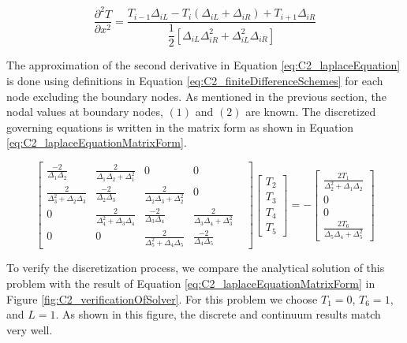 \begin{equation}\label{eq:C2_finiteDifferenceSchemes}
	\frac{\partial^2 T}{\partial x^2} = 
	\frac{T_{i-1} \Delta_{iL} - 
	      T_{i} (\Delta_{iL} + \Delta_{iR}) + 
	      T_{i+1} \Delta_{iR}}
	     {\dfrac{1}{2} \left[ \Delta_{iL} \Delta_{iR}^2 + 
	                         \Delta_{iL}^2 \Delta_{iR} \right]}
\end{equation}

The approximation of the second derivative in Equation \eqref{eq:C2_laplaceEquation} is done using definitions in Equation \eqref{eq:C2_finiteDifferenceSchemes} for each node excluding the boundary nodes. As mentioned in the previous section, the nodal values at boundary nodes, $(1)$ and $(2)$ are known. The discretized governing equations is written in the matrix form as shown in Equation \eqref{eq:C2_laplaceEquationMatrixForm}.

\begin{equation}\label{eq:C2_laplaceEquationMatrixForm}
	\begin{bmatrix}
		\frac{-2}{\Delta_{1} \Delta_{2}} &
		\frac{2}{\Delta_{1} \Delta_{2} + \Delta_{1}^2} &
		0 &
		0 &
		\\
		\frac{2}{\Delta_{3}^2 + \Delta_{2} \Delta_{3}} & 
		\frac{-2}{\Delta_{2} \Delta_{3}} &
		\frac{2}{\Delta_{2} \Delta_{3} + \Delta_{2}^2} &
		0
		\\
		0 &
		\frac{2}{\Delta_{4}^2 + \Delta_{3} \Delta_{4}} & 
		\frac{-2}{\Delta_{3} \Delta_{4}} &
		\frac{2}{\Delta_{3} \Delta_{4} + \Delta_{3}^2} &
		\\
		0 &
		0 &
		\frac{2}{\Delta_{5}^2 + \Delta_{4} \Delta_{5}} & 
		\frac{-2}{\Delta_{4} \Delta_{5}}
	\end{bmatrix}
	\begin{bmatrix}
		T_2 \\
		T_3 \\
		T_4 \\
		T_5
	\end{bmatrix}
	=
	-\begin{bmatrix}
	 	\frac{2T_1}{\Delta_{2}^2 + \Delta_{1} \Delta_{2}} \\
 		0 \\
		0 \\
		\frac{2T_6}{\Delta_{5} \Delta_{4} + \Delta_{5}^2}
	\end{bmatrix}
\end{equation}

To verify the discretization process, we compare the analytical solution of this problem with the result of Equation \eqref{eq:C2_laplaceEquationMatrixForm} in Figure \ref{fig:C2_verificationOfSolver}. For this problem we choose $T_1 = 0$, $T_6 = 1$, and $L = 1$.  As shown in this figure, the discrete and continuum results match very well.

